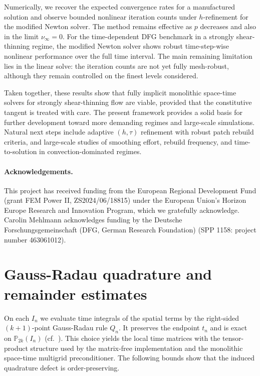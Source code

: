 \documentclass[DIV=16]{scrartcl}
\newcommand{\In}{I_n}
\newcommand{\pn}{p}
\begin{document}
Numerically, we recover the expected convergence rates for a manufactured
solution and observe bounded nonlinear iteration counts under $h$-refinement for
the modified Newton solver. The method remains effective as $\pn$ decreases and
also in the limit $\nu_\infty=0$. For the time-dependent DFG benchmark in
a strongly shear-thinning regime, the modified Newton solver shows robust
time-step-wise nonlinear performance over the full time interval. The main
remaining limitation lies in the linear solve: the iteration counts are not yet
fully mesh-robust, although they remain controlled on the finest levels
considered.

Taken together, these results show that fully implicit monolithic space-time
solvers for strongly shear-thinning flow are viable, provided that the
constitutive tangent is treated with care. The present framework provides a
solid basis for further development toward more demanding regimes and
large-scale simulations. Natural next steps include adaptive
$(h,\tau)$ refinement with robust patch rebuild criteria, and large-scale
studies of smoothing effort, rebuild frequency, and time-to-solution in
convection-dominated regimes.

\paragraph*{Acknowledgements.}
This project has received funding from the European Regional Development Fund (grant FEM Power II, ZS2024/06/18815) under the European Union's Horizon Europe Research and Innovation Program, which we gratefully acknowledge. Carolin Mehlmann acknowledges funding by the Deutsche Forschungsgemeinschaft (DFG, German Research Foundation) (SPP 1158: project number 463061012).

\appendix
\section{Gauss-Radau quadrature and remainder estimates}\label{sec:gr-underint}
On each $\In$ we evaluate time integrals of the spatial terms by the right-sided $(k{+}1)$-point
Gauss-Radau rule $Q_n$. It preserves the endpoint $t_n$ and is exact on $\mathbb P_{2k}(\In)$
(cf.~\cite{DavisRabinowitz1984Methods}). This choice yields the
local time matrices with the tensor-product structure used by the matrix-free implementation and
the monolithic space-time multigrid preconditioner. The following bounds show that the induced
quadrature defect is order-preserving.
\end{document}
